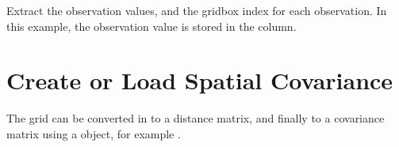 \documentclass[letterpaper,10pt,english]{sphinxmanual}
\begin{document}
\sphinxAtStartPar
Extract the observation values, and the grid\sphinxhyphen{}box index for each observation. In this example, the
observation value is stored in the  column.

\begin{sphinxVerbatim}[commandchars=\\\{\}]
  \PYG{p}{[}\PYG{p}{]}
  \PYG{p}{[}\PYG{p}{]}
\end{sphinxVerbatim}


\section{Create or Load Spatial Covariance}
\label{\detokenize{workflow:create-or-load-spatial-covariance}}
\sphinxAtStartPar
The grid can be converted in to a distance matrix, and finally to a covariance matrix using a
 object, for example
{\hyperref[\detokenize{covariance:glomar_gridding.variogram.GaussianVariogram}]{}}.

\begin{sphinxVerbatim}[commandchars=\\\{\}]
  

  

   
\end{sphinxVerbatim}
\end{document}
